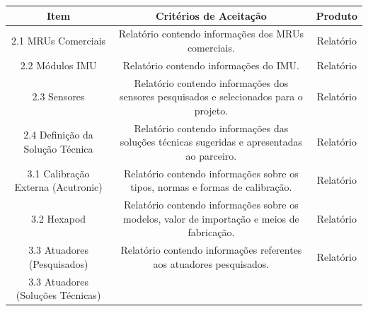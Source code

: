 \begin{center}
    \begin{center}
    \small
    \begin{tabular}{|c|c|c|}
        \hline
        Item & Critérios de Aceitação & Produto \\
        \hline
        \multicolumn{1}{|m{5cm}|}{2.1 MRUs Comerciais} 
        & \multicolumn{1}{m{5cm}|}{
            Relatório contendo informações dos MRUs comerciais.
        }
        & \multicolumn{1}{m{5cm}|}{
        \centering
            Relatório
        } \\
        \hline
        \multicolumn{1}{|m{5cm}|}{2.2 Módulos IMU} 
        & \multicolumn{1}{m{5cm}|}{
            Relatório contendo informações do IMU.
        }
        & \multicolumn{1}{m{5cm}|}{
        \centering
            Relatório
        } \\
        \hline
        \multicolumn{1}{|m{5cm}|}{2.3 Sensores} 
        & \multicolumn{1}{m{5cm}|}{
            Relatório contendo informações dos sensores pesquisados e selecionados para o projeto.
        }
        & \multicolumn{1}{m{5cm}|}{
        \centering
            Relatório
        } \\
        \hline
        \multicolumn{1}{|m{5cm}|}{2.4 Definição da Solução Técnica} 
        & \multicolumn{1}{m{5cm}|}{
            Relatório contendo informações das soluções técnicas sugeridas e apresentadas ao parceiro.
        }
        & \multicolumn{1}{m{5cm}|}{
        \centering
            Relatório
        } \\
        \hline
        \multicolumn{1}{|m{5cm}|}{3.1 Calibração Externa (Acutronic)} 
        & \multicolumn{1}{m{5cm}|}{
            Relatório contendo informações sobre os tipos, normas e formas de calibração.
        }
        & \multicolumn{1}{m{5cm}|}{
        \centering
            Relatório
        } \\
        \hline
        \multicolumn{1}{|m{5cm}|}{3.2 Hexapod} 
        & \multicolumn{1}{m{5cm}|}{
            Relatório contendo informações sobre os modelos, valor de importação e meios de fabricação.
        }
        & \multicolumn{1}{m{5cm}|}{
        \centering
            Relatório
        } \\
        \hline
        \multicolumn{1}{|m{5cm}|}{3.3 Atuadores (Pesquisados)} 
        & \multicolumn{1}{m{5cm}|}{
            Relatório contendo informações referentes aos atuadores pesquisados.
        }
        & \multicolumn{1}{m{5cm}|}{
        \centering
            Relatório
        } \\
        \hline
        \multicolumn{1}{|m{5cm}|}{3.3 Atuadores (Soluções Técnicas)} 

\end{tabular}
\end{center}
\end{center}
